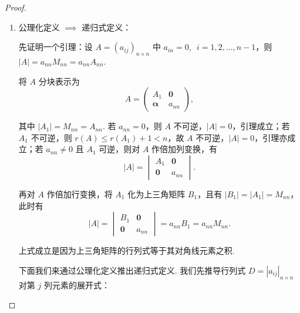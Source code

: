\begin{proof}
    \begin{enumerate}
        \item 公理化定义 $\implies$ 递归式定义：

            先证明一个引理：设 $A=(a_{ij})_{n \times n}$ 中 $a_{in}=0,\enspace i = 1, 2, \ldots, n-1$，则 $|A| = a_{nn} M_{nn} = a_{nn} A_{nn}$.

            将 $A$ 分块表示为
            \[
                A = \begin{pmatrix}
                    A_1             & \mathbf{0} \\
                    \mathbf{\alpha} & a_{nn}
                \end{pmatrix},
            \]

            其中 $|A_1| = M_{nn} = A_{nn}$. 若 $a_{nn} = 0$，则 $A$ 不可逆，$|A| = 0$，引理成立；若 $A_1$ 不可逆，则 $r(A) \leqslant r(A_1) + 1 < n$，故 $A$ 不可逆，$|A| = 0$，引理亦成立；若 $a_{nn} \neq 0$ 且 $A_1$ 可逆，则对 $A$ 作倍加列变换，有
            \[
                |A| = \begin{vmatrix}
                    A_1             & \mathbf{0} \\
                    \mathbf{0}      & a_{nn}
                \end{vmatrix}.
            \]

            再对 $A$ 作倍加行变换，将 $A_1$ 化为上三角矩阵 $B_1$，且有 $|B_1| = |A_1| = M_{nn}$，此时有
            \[
                |A| = \begin{vmatrix}
                    B_1             & \mathbf{0} \\
                    \mathbf{0}      & a_{nn}
                \end{vmatrix} = a_{nn} B_1 = a_{nn} M_{nn}.
            \]

            上式成立是因为上三角矩阵的行列式等于其对角线元素之积.

            下面我们来通过公理化定义推出递归式定义. 我们先推导行列式 $D=|a_{ij}|_{n \times n}$ 对第 $j$ 列元素的展开式：


\end{enumerate}
\end{proof}
